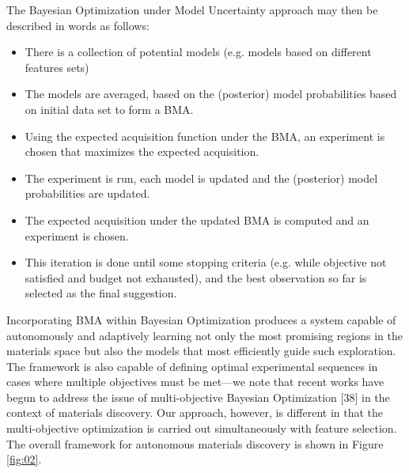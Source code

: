 \documentclass[utf8]{frontiersSCNS} %
\begin{document}
The  Bayesian Optimization under Model Uncertainty approach may then be described in words as follows:

\begin{itemize}
\item There is a collection of potential models (e.g. models based on different features sets)
\item The models are averaged, based on the (posterior) model probabilities based on initial data set to form a BMA.
\item Using the expected acquisition function under the BMA, an experiment is chosen that maximizes the expected acquisition.
\item The experiment is run, each model is updated and the (posterior) model probabilities are updated.
\item The expected acquisition under the updated BMA is computed and an experiment is chosen.
\item This iteration is done until some stopping criteria (e.g. while objective not satisfied and budget not exhausted), and the best observation so far is selected as the final suggestion.
\end{itemize}
Incorporating BMA within Bayesian Optimization produces a system capable of autonomously and adaptively learning not only the most promising regions in the materials space but also the models that most efficiently guide such exploration. The framework is also capable of defining optimal experimental sequences in cases where multiple objectives must be met—we note that recent works have begun to address the issue of multi-objective Bayesian Optimization [38] in the context of materials discovery. Our approach, however, is different in that the multi-objective optimization is carried out simultaneously with feature selection.
The overall framework for autonomous materials discovery is shown in Figure \ref{fig:02}. 
\end{document}
